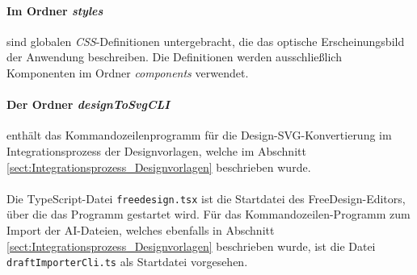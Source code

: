 \paragraph{Im Ordner \emph{styles}} sind globalen \emph{CSS}-Definitionen untergebracht, die das optische Erscheinungsbild der Anwendung beschreiben. Die Definitionen werden ausschließlich Komponenten im Ordner \emph{components} verwendet. 

\paragraph{Der Ordner \emph{designToSvgCLI}} enthält das Kommandozeilenprogramm für die Design-SVG-Konvertierung im Integrationsprozess der Designvorlagen, welche im Abschnitt \ref{sect:Integrationsprozess_Designvorlagen} beschrieben wurde.


\paragraph{}Die TypeScript-Datei \lstinline|freedesign.tsx| ist die Startdatei des FreeDesign-Editors, über die das Programm gestartet wird. Für das Kommandozeilen-Programm zum Import der AI-Dateien, welches ebenfalls in Abschnitt \ref{sect:Integrationsprozess_Designvorlagen} beschrieben wurde, ist die Datei \lstinline|draftImporterCli.ts| als Startdatei vorgesehen.







